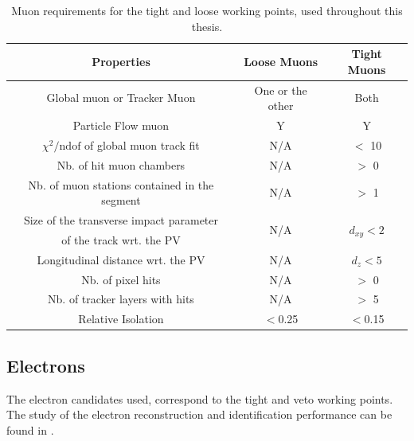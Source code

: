 \begin{table}[htbp]
	\centering
	\caption{Muon requirements for the tight and loose working points, used throughout this thesis.}
	\begin{tabular}{ccc}
		\toprule
		Properties & Loose Muons & Tight Muons \\ 
		\midrule 
		Global muon or Tracker Muon & One or the other & Both \\ 
	
		Particle Flow muon & Y & Y \\ 
		
		$\chi^2/\mathrm{ndof}$ of global muon track fit & N/A & $<$ 10 \\ 
	
		Nb. of hit muon chambers & N/A & $>$ 0 \\ 
		
		Nb. of muon stations contained in the segment & N/A & $>$ 1  \\ 
		
		 Size of the transverse impact parameter  & \multirow{2}{*}{N/A }& \multirow{2}{*}{$d_{xy} < 2$ \mm} \\ 
	 of the track wrt. the PV & & \\
		Longitudinal distance wrt. the PV & N/A & $d_z < 5$ \mm \\ 
		
		Nb. of pixel hits & N/A & $>$ 0 \\ 
		
		Nb. of tracker layers with hits & N/A & $>$ 5 \\ 
	
		Relative Isolation & $<$0.25 & $<$0.15 \\
		\bottomrule
	\end{tabular} 
	
	\label{tab:MuonReq}
\end{table}


\newpage
\subsection{Electrons}
\label{sec:ElectronID}
The electron candidates used, correspond to the tight and veto working points. The study of the electron reconstruction and identification performance can be found in \cite{CMS-DP-2017-004}.

